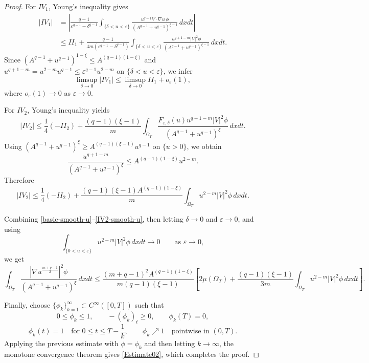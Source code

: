 \documentclass[10pt,a4paper]{amsart}
\begin{document}
\begin{proof}
For $IV_1$, Young's inequality gives
\[
\begin{aligned}
|IV_1|
&=
\left|
\frac{q-1}{\varepsilon^{q-1}-\delta^{q-1}}
\int_{\{\delta<u<\varepsilon\}}
\frac{
u^{q-1}V\cdot\nabla u\,\phi
}
{\left(A^{q-1}+u^{q-1}\right)^{\xi-1}}
\,dxdt
\right| \\
&\le
II_1 +
\frac{q-1}{4m(\varepsilon^{q-1}-\delta^{q-1})}
\int_{\{\delta<u<\varepsilon\}}
\frac{
u^{q+1-m}|V|^2\phi
}
{\left(A^{q-1}+u^{q-1}\right)^{\xi-1}}
\,dxdt.
\end{aligned}
\]
Since
$
\left(A^{q-1}+u^{q-1}\right)^{1-\xi}
\le
A^{(q-1)(1-\xi)}
$
and
$
u^{q+1-m}
=
u^{2-m}u^{q-1}
\le
\varepsilon^{q-1}u^{2-m}
$ 
on $\{\delta<u<\varepsilon\}$,
we infer
\begin{equation}\label{IV1-smooth-u}
\limsup_{\delta\to0}|IV_1|
\le
\limsup_{\delta\to0}II_1
+
o_\varepsilon(1),
\end{equation}
where $o_\varepsilon(1)\to0$ as $\varepsilon\to0$.

For $IV_2$, Young's inequality yields
\[
|IV_2|
\le
\frac14(-II_2)
+
\frac{(q-1)(\xi-1)}{m}
\int_{\Omega_T}
\frac{
F_{\varepsilon,\delta}(u)u^{q+1-m}|V|^2\phi
}
{\left(A^{q-1}+u^{q-1}\right)^\xi}
\,dxdt.
\]
Using
$
\left(A^{q-1}+u^{q-1}\right)^\xi
\ge
A^{(q-1)(\xi-1)}u^{q-1}
$ on $\{u>0\}$,
we obtain
\[
\frac{u^{q+1-m}}
{\left(A^{q-1}+u^{q-1}\right)^\xi}
\le
A^{(q-1)(1-\xi)}u^{2-m}.
\]
Therefore
\begin{equation}\label{IV2-smooth-u}
|IV_2|
\le
\frac14(-II_2)
+
\frac{(q-1)(\xi-1)A^{(q-1)(1-\xi)}}{m}
\int_{\Omega_T}u^{2-m}|V|^2\phi\,dxdt.
\end{equation}

Combining
\eqref{basic-smooth-u}--\eqref{IV2-smooth-u}, then letting
$\delta\to0$ and $\varepsilon\to0$, and using
\[
\int_{\{0<u<\varepsilon\}}
u^{2-m}|V|^2\phi\,dxdt
\to0
\qquad\text{as }\varepsilon\to0,
\]
we get
\[
\int_{\Omega_T}
\frac{
\left|\nabla u^{\frac{m+q-1}{2}}\right|^2\phi
}
{\left(A^{q-1}+u^{q-1}\right)^\xi}
\,dxdt \le
\frac{(m+q-1)^2A^{(q-1)(1-\xi)}}
{m(q-1)(\xi-1)}
\left[
2\mu(\Omega_T)
+
\frac{(q-1)(\xi-1)}{3m}
\int_{\Omega_T}u^{2-m}|V|^2\phi\,dxdt
\right].
\]


Finally, choose $\{\phi_k\}_{k=1}^\infty\subset C^\infty([0,T])$ such that
\[
0\le\phi_k\le1,\qquad -(\phi_k)_t\ge0,\qquad \phi_k(T)=0,
\]
\[
\phi_k(t)=1
\quad\text{for }0\le t\le T-\frac1k,
\qquad
\phi_k\nearrow1
\quad\text{pointwise in }(0,T).
\]
Applying the previous estimate with $\phi=\phi_k$ and then letting
$k\to\infty$, the monotone convergence theorem gives \eqref{Estimate02}, which completes the proof.
\end{proof}
\end{document}

